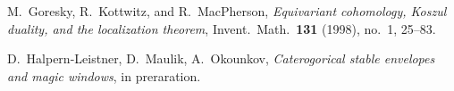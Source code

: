 \documentclass[14pt]{extarticle}
\theoremstyle{definition}
\begin{document}
\begin{bibdiv}
\begin{biblist}
M.~Goresky, R.~Kottwitz, and R.~MacPherson, 
\emph{Equivariant cohomology, Koszul duality, and the localization
  theorem},
 Invent.\ Math.\ \textbf{131} (1998), no.~1, 25--83. 


  D.~Halpern-Leistner, D.~Maulik, A.~Okounkov,
  \emph{Caterogorical stable envelopes and magic windows}, 
in preraration. 


  





\end{biblist}
\end{bibdiv}
\end{document}
